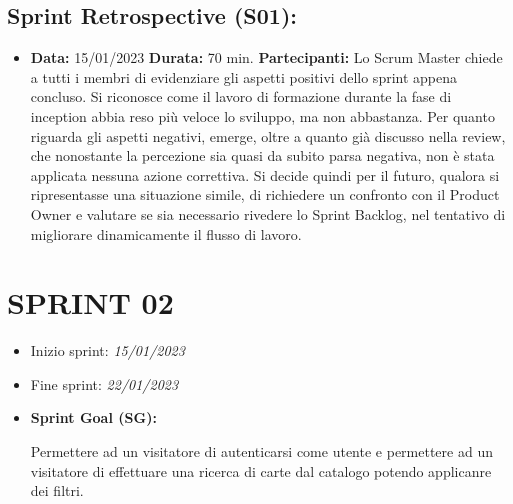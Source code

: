 \begin{landscape}
        \subsection{Sprint Retrospective (S01):}
        \begin{itemize}
            \item \textbf{Data:} 15/01/2023
            \newline \textbf{Durata:} 70 min.
            \newline \textbf{Partecipanti:} \unoP \uno
            \newline
            \newline Lo Scrum Master chiede a tutti i membri di evidenziare gli aspetti positivi dello sprint appena concluso. Si riconosce come il lavoro di formazione durante la fase di inception abbia reso più veloce lo sviluppo, ma non abbastanza. Per quanto riguarda gli aspetti negativi, emerge, oltre a quanto già discusso nella review, che nonostante la percezione sia quasi da subito parsa negativa, non è stata applicata nessuna azione correttiva. Si decide quindi per il futuro, qualora si ripresentasse una situazione simile, di richiedere un confronto con il Product Owner e valutare se sia necessario rivedere lo Sprint Backlog, nel tentativo di migliorare dinamicamente il flusso di lavoro.
        \end{itemize}

        \newpage

        \section{SPRINT 02}

        \begin{itemize}
            \item Inizio sprint: \textit{15/01/2023}
            \item Fine sprint: \textit{22/01/2023}
        \end{itemize}

        \begin{itemize}
            \item \textbf{Sprint Goal (SG):}
            \begin{indent}
                \newline Permettere ad un visitatore di autenticarsi come utente e permettere ad un visitatore di effettuare una ricerca di carte dal catalogo potendo applicanre dei filtri.
            \end{indent}
        \end{itemize}


\end{landscape}
